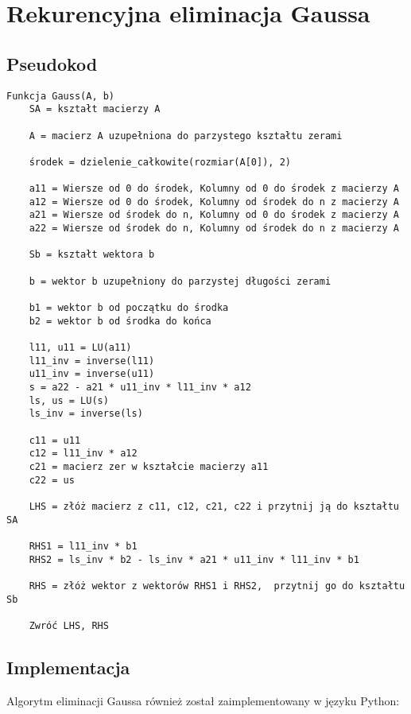 \documentclass{article}
\begin{document}
\section{Rekurencyjna eliminacja Gaussa}
\subsection{Pseudokod}

\begin{verbatim}
Funkcja Gauss(A, b)
    SA = kształt macierzy A

    A = macierz A uzupełniona do parzystego kształtu zerami

    środek = dzielenie_całkowite(rozmiar(A[0]), 2) 
    
    a11 = Wiersze od 0 do środek, Kolumny od 0 do środek z macierzy A
    a12 = Wiersze od 0 do środek, Kolumny od środek do n z macierzy A
    a21 = Wiersze od środek do n, Kolumny od 0 do środek z macierzy A
    a22 = Wiersze od środek do n, Kolumny od środek do n z macierzy A

    Sb = kształt wektora b

    b = wektor b uzupełniony do parzystej długości zerami

    b1 = wektor b od początku do środka
    b2 = wektor b od środka do końca

    l11, u11 = LU(a11)
    l11_inv = inverse(l11)
    u11_inv = inverse(u11)
    s = a22 - a21 * u11_inv * l11_inv * a12
    ls, us = LU(s)
    ls_inv = inverse(ls)

    c11 = u11
    c12 = l11_inv * a12
    c21 = macierz zer w kształcie macierzy a11
    c22 = us

    LHS = złóż macierz z c11, c12, c21, c22 i przytnij ją do kształtu SA

    RHS1 = l11_inv * b1
    RHS2 = ls_inv * b2 - ls_inv * a21 * u11_inv * l11_inv * b1

    RHS = złóż wektor z wektorów RHS1 i RHS2,  przytnij go do kształtu Sb

    Zwróć LHS, RHS
\end{verbatim}

\subsection{Implementacja}

Algorytm eliminacji Gaussa również został zaimplementowany w języku Python:
\end{document}
